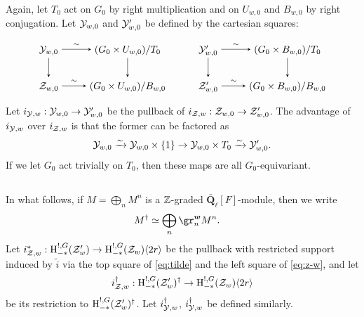 \documentclass[a4paper,10pt,leqno]{amsart}
\theoremstyle{plain}
\theoremstyle{plain}
\theoremstyle{plain}
\theoremstyle{definition}
\theoremstyle{remark}
\newcommand{\QL}{\bar{\mathbf{Q}}_\ell}
\begin{document}
Again, let $T_0$ act on $G_0$ by right multiplication and on $U_{w, 0}$ and $B_{w, 0}$ by right conjugation.
Let $\cal{Y}_{w, 0}$ and $\cal{Y}'_{w, 0}$ be defined by the cartesian squares:
\begin{equation}
\begin{tikzpicture}[baseline=(current bounding box.center), >=stealth]
\matrix(m)[matrix of math nodes, row sep=2em, column sep=2.5em, text height=2ex, text depth=0.5ex]
{	\cal{Y}_{w, 0}
		&(G_0 \times U_{w, 0})/T_0\\
	\cal{Z}_{w, 0}
		&(G_0 \times U_{w, 0})/B_{w, 0}\\
		};
\path[->,font=\scriptsize, auto]
(m-1-1)		edge node{$\sim$} (m-1-2)
(m-1-1)		edge (m-2-1)
(m-1-2)		edge (m-2-2)
(m-2-1)		edge node{$\sim$} (m-2-2);
\end{tikzpicture}
\qquad
\begin{tikzpicture}[baseline=(current bounding box.center), >=stealth]
\matrix(m)[matrix of math nodes, row sep=2em, column sep=2.5em, text height=2ex, text depth=0.5ex]
{	\cal{Y}'_{w, 0}
		&(G_0 \times B_{w, 0})/T_0\\
	\cal{Z}'_{w, 0}
		&(G_0 \times B_{w, 0})/B_{w, 0}\\
		};
\path[->,font=\scriptsize, auto]
(m-1-1)		edge node{$\sim$} (m-1-2)
(m-1-1)		edge (m-2-1)
(m-1-2)		edge (m-2-2)
(m-2-1)		edge node{$\sim$} (m-2-2);
\end{tikzpicture}
\end{equation}
Let $i_{\cal{Y}, w} : \cal{Y}_{w, 0} \to \cal{Y}'_{w, 0}$ be the pullback of $i_{\cal{Z}, w} : \cal{Z}_{w, 0} \to \cal{Z}'_{w, 0}$.
The advantage of $i_{\cal{Y}, w}$ over $i_{\cal{Z}, w}$ is that the former can be factored as
\begin{align}
\cal{Y}_{w, 0} \xrightarrow{\sim} \cal{Y}_{w, 0} \times \{1\}
\to 
\cal{Y}_{w, 0} \times T_0 \xrightarrow{\sim} \cal{Y}'_{w, 0}.
\end{align}
If we let $G_0$ act trivially on $T_0$, then these maps are all $G_0$-equivariant.

\subsection{}

In what follows, if $M = \bigoplus_n M^n$ is a $\bb{Z}$-graded $\QL[F]$-module, then we write 
\begin{align}\begin{split}
M^\dagger 
&\simeq \bigoplus_n {\gr_n^{\bm{w}} M^n}.
\end{split}\end{align}
Let $i_{\cal{Z}, w}^\ast : \ur{H}_{-\ast}^{!, G}(\cal{Z}'_w) \to \ur{H}_{-\ast}^{!, G}(\cal{Z}_w)\langle 2r\rangle$ be the pullback with restricted support induced by $\tilde{i}$ via the top square of \eqref{eq:tilde} and the left square of \eqref{eq:z-w}, and let
\begin{align}
i_{\cal{Z}, w}^\dagger : \ur{H}_{-\ast}^{!, G}(\cal{Z}'_w)^\dagger \to \ur{H}_{-\ast}^{!, G}(\cal{Z}_w)\langle 2r\rangle
\end{align}
be its restriction to $\ur{H}_{-\ast}^{!, G}(\cal{Z}'_w)^\dagger$.
Let $i_{\cal{Y}, w}^\dagger$, $i_{\cal{Y}, w}^\dagger$ be defined similarly.
\end{document}
